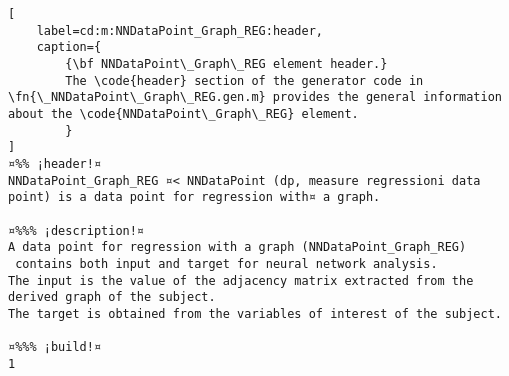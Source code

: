 \documentclass{tufte-handout}
\begin{document}
\begin{lstlisting}[
	label=cd:m:NNDataPoint_Graph_REG:header,
	caption={
		{\bf NNDataPoint\_Graph\_REG element header.}
		The \code{header} section of the generator code in \fn{\_NNDataPoint\_Graph\_REG.gen.m} provides the general information about the \code{NNDataPoint\_Graph\_REG} element.
		}
]
¤%% ¡header!¤
NNDataPoint_Graph_REG ¤< NNDataPoint (dp, measure regressioni data point) is a data point for regression with¤ a graph.

¤%%% ¡description!¤
A data point for regression with a graph (NNDataPoint_Graph_REG) 
 contains both input and target for neural network analysis.
The input is the value of the adjacency matrix extracted from the derived graph of the subject.
The target is obtained from the variables of interest of the subject.

¤%%% ¡build!¤
1
\end{lstlisting}
\end{document}
